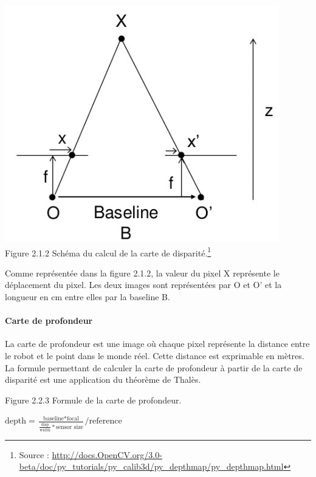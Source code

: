 \documentclass[12pt,a4paper]{report}
\begin{document}
\begin{center}
	\includegraphics[scale=0.5]{disparity.jpg}\\
	Figure 2.1.2 Schéma du calcul de la carte de disparité.\footnote{Source : \url{http://docs.OpenCV.org/3.0-beta/doc/py_tutorials/py_calib3d/py_depthmap/py_depthmap.html}}\\
\end{center}

Comme représentée dans la figure 2.1.2, la valeur du pixel X représente le déplacement du pixel.
Les deux images sont représentées par O et O' et la longueur en cm entre elles par la baseline B.
\paragraph{Carte de profondeur}
La carte de profondeur est une image où chaque pixel représente la distance entre le robot et le point dans le monde réel. Cette distance est exprimable en mètres.\\
La formule permettant de calculer la carte de profondeur à partir de la carte de disparité est une application du théorème de Thalès.\\

\begin{center}
Figure 2.2.3 Formule de la carte de profondeur.\\

\begin{huge}
$\text{depth} = \frac{\text{baseline} * \text{focal}}{\frac{\text{disp}}{\text{width}} * \text{sensor size}} / \text{reference}$\\
\end{huge}
\end{center}
\end{document}
